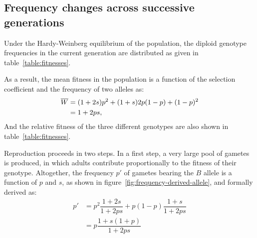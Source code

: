 \subsection{Frequency changes across successive generations}

Under the Hardy-Weinberg equilibrium of the population, the \gls{diploid} genotype frequencies in the current generation are distributed as given in table~\ref{table:fitnesses}.

As a result, the mean fitness in the population is a function of the selection coefficient and the frequency of two \glspl{allele} as:
\begin{align}
    \overline{W} &= (1+2s)p^2 + (1+s)2p(1-p) + (1-p)^2 \\
    &= 1 + 2ps,
\end{align}
And the relative fitness of the three different genotypes are also shown in table~\ref{table:fitnesses}.

\begin{table}[H]
    \centering
    \noindent{}
    \caption[Fitnesses of the different genotypes]{Fitnesses of the different genotypes}\label{table:fitnesses}
\end{table}

Reproduction proceeds in two steps.
In a first step, a very large pool of \glspl{gamete} is produced, in which adults contribute proportionally to the fitness of their genotype.
Altogether, the frequency $p'$ of \glspl{gamete} bearing the $B$ \gls{allele} is a function of $p$ and $s$, as shown in figure~\ref{fig:frequency-derived-allele}, and formally derived as:
\begin{align}
    p' & = p^2 \dfrac{1+2s}{1+2ps} + p (1-p)\dfrac{1+s}{1+2ps}\\
    & = p\dfrac{1+s(1+p)}{1 + 2ps}
\end{align}

